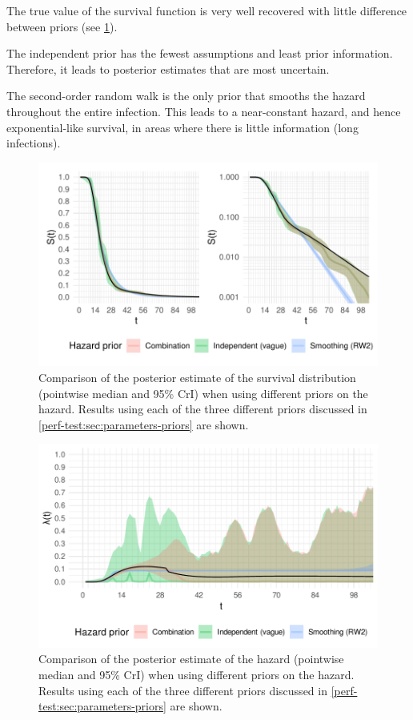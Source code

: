 \documentclass[thesis.tex]{subfiles}
\begin{document}
The true value of the survival function is very well recovered with little difference between priors (see \cref{perf-test:fig:survival-results}).

The independent prior has the fewest assumptions and least prior information.
Therefore, it leads to posterior estimates that are most uncertain.

The second-order random walk is the only prior that smooths the hazard throughout the entire infection.
This leads to a near-constant hazard, and hence exponential-like survival, in areas where there is little information (long infections).

\begin{figure}
  \centering \includegraphics{cis-perfect-testing/survival-results}
  \caption[Comparison of survival function estimates under different priors]{Comparison of the posterior estimate of the survival distribution (pointwise median and 95\% CrI) when using different priors on the hazard. Results using each of the three different priors discussed in \cref{perf-test:sec:parameters-priors} are shown. \label{perf-test:fig:survival-results}}
\end{figure}

\begin{figure}
  \centering \includegraphics{cis-perfect-testing/hazard-results}
  \caption[Comparison of hazard estimates under different priors]{Comparison of the posterior estimate of the hazard (pointwise median and 95\% CrI) when using different priors on the hazard. Results using each of the three different priors discussed in \cref{perf-test:sec:parameters-priors} are shown. \label{perf-test:fig:hazard-results}}
\end{figure}
\end{document}
